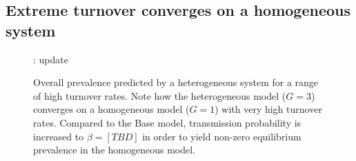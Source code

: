 \subsection{Extreme turnover converges on a homogeneous system}\label{aa:homogenize}
\begin{figure}[H]
  \centering
  \vspace{5em}
  : update
  \vspace{5em}
  \caption{Overall prevalence predicted by a heterogeneous system
    for a range of high turnover rates.
    Note how the heterogeneous model ($G = 3$) converges on a homogeneous model ($G = 1$)
    with very high turnover rates.
    Compared to the Base model,
    transmission probability is increased to $\beta = [TBD]$
    in order to yield non-zero equilibrium prevalence in the homogeneous model.}
  \label{fig:hetero-converge}
\end{figure}
